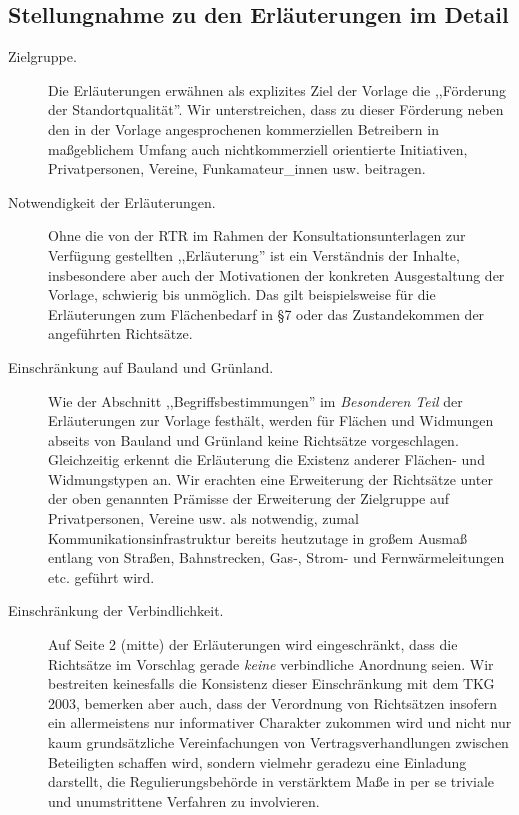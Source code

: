 \documentclass[parskip=half]{scrreprt}
\begin{document}
\subsection*{Stellungnahme zu den Erläuterungen im Detail}

\begin{description}

\item[Zielgruppe.] Die Erläuterungen erwähnen als explizites Ziel
der Vorlage die ,,Förderung der Standortqualität''. Wir unterstreichen,
dass zu dieser Förderung neben den in der Vorlage angesprochenen
kommerziellen Betreibern in maßgeblichem Umfang auch nichtkommerziell
orientierte Initiativen, Privatpersonen, Vereine, Funkamateur\_innen
usw. beitragen.

\item[Notwendigkeit der Erläuterungen.] Ohne die von der RTR im
Rahmen der Konsultationsunterlagen zur Verfügung gestellten
,,Erläuterung'' ist ein Verständnis der Inhalte, insbesondere aber
auch der Motivationen der konkreten Ausgestaltung der Vorlage,
schwierig bis unmöglich. Das gilt beispielsweise für die
Erläuterungen zum Flächenbedarf in §7 oder das Zustandekommen
der angeführten Richtsätze. 

\item[Einschränkung auf Bauland und Grünland.] Wie der Abschnitt
,,Begriffsbestimmungen'' im \textit{Besonderen Teil} der Erläuterungen
zur Vorlage festhält, werden für Flächen und Widmungen abseits von
Bauland und Grünland keine Richtsätze vorgeschlagen. Gleichzeitig
erkennt die Erläuterung die Existenz anderer Flächen- und Widmungstypen
an. Wir erachten eine Erweiterung der Richtsätze unter der oben genannten
Prämisse der Erweiterung der Zielgruppe auf Privatpersonen, Vereine
usw. als notwendig, zumal Kommunikationsinfrastruktur bereits heutzutage
in großem Ausmaß entlang von Straßen, Bahnstrecken, Gas-, Strom- und Fernwärmeleitungen etc. geführt wird.

\item[Einschränkung der Verbindlichkeit.] Auf Seite 2 (mitte) der
Erläuterungen wird eingeschränkt, dass die Richtsätze im Vorschlag
gerade \textit{keine} verbindliche Anordnung seien. Wir bestreiten
keinesfalls die Konsistenz dieser Einschränkung mit dem TKG 2003,
bemerken aber auch, dass der Verordnung von Richtsätzen insofern
ein allermeistens nur informativer Charakter zukommen wird und nicht
nur kaum grundsätzliche Vereinfachungen von Vertragsverhandlungen
zwischen Beteiligten schaffen wird, sondern vielmehr geradezu eine
Einladung darstellt, die Regulierungsbehörde in verstärktem Maße
in per se triviale und unumstrittene Verfahren zu involvieren.


\end{description}
\end{document}
